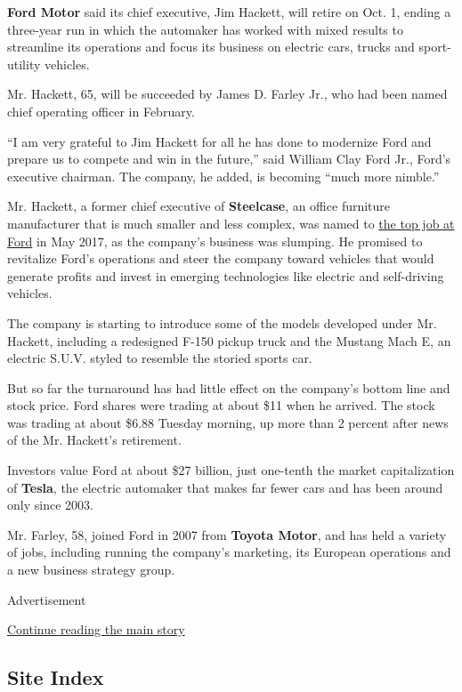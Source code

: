 \textbf{Ford Motor} said its chief executive, Jim Hackett, will retire
on Oct. 1, ending a three-year run in which the automaker has worked
with mixed results to streamline its operations and focus its business
on electric cars, trucks and sport-utility vehicles.

Mr. Hackett, 65, will be succeeded by James D. Farley Jr., who had been
named chief operating officer in February.

``I am very grateful to Jim Hackett for all he has done to modernize
Ford and prepare us to compete and win in the future,'' said William
Clay Ford Jr., Ford's executive chairman. The company, he added, is
becoming ``much more nimble.''

Mr. Hackett, a former chief executive of \textbf{Steelcase}, an office
furniture manufacturer that is much smaller and less complex, was named
to
\href{https://www.nytimes3xbfgragh.onion/2017/05/22/business/jim-hackett-ford.html}{the
top job at Ford} in May 2017, as the company's business was slumping. He
promised to revitalize Ford's operations and steer the company toward
vehicles that would generate profits and invest in emerging technologies
like electric and self-driving vehicles.

The company is starting to introduce some of the models developed under
Mr. Hackett, including a redesigned F-150 pickup truck and the Mustang
Mach E, an electric S.U.V. styled to resemble the storied sports car.

But so far the turnaround has had little effect on the company's bottom
line and stock price. Ford shares were trading at about \$11 when he
arrived. The stock was trading at about \$6.88 Tuesday morning, up more
than 2 percent after news of the Mr. Hackett's retirement.

Investors value Ford at about \$27 billion, just one-tenth the market
capitalization of \textbf{Tesla}, the electric automaker that makes far
fewer cars and has been around only since 2003.

Mr. Farley, 58, joined Ford in 2007 from \textbf{Toyota Motor}, and has
held a variety of jobs, including running the company's marketing, its
European operations and a new business strategy group.

Advertisement

\protect\hyperlink{after-bottom}{Continue reading the main story}

\hypertarget{site-index}{%
\subsection{Site Index}\label{site-index}}

